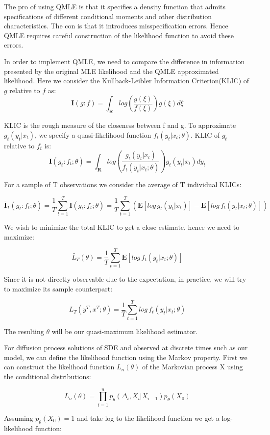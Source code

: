 \begin{spacing}{1.5}
The pro of using QMLE is that it specifies a density function that admits specifications of different conditional moments and other distribution characteristics. The con is that it introduces misspecification errors. Hence QMLE requires careful construction of the likelihood function to avoid these errors.

In order to implement QMLE, we need to compare the difference in information presented by the original MLE likelihood and the QMLE approximated likelihood. Here we consider the Kullback-Leibler Information Criterion(KLIC) of $g$ relative to $f$ as: 
$$
 \mathbf{I} (g:f) = \int_{\mathbf{R}} log(\frac{g(\xi)}{f(\xi)})g(\xi)d\xi
$$

KLIC is the rough measure of the closeness between f and g. To approximate $g_t(y_t|x_t)$, we specify a quasi-likelihood function $f_t(y_t|x_t;\theta)$. KLIC of $g_t$ relative to $f_t$ is:
$$
 \mathbf{I} (g_t:f_t;\theta) = \int_{\mathbf{R}} log(\frac{g_t(y_t|x_t)}{f_t(y_t|x_t;\theta)})g_t(y_t|x_t)dy_t
$$

For a sample of T observations we consider the average of T individual KLICs:

$$
 \bar{\mathbf{I}}_T (g_t:f_t;\theta) = \frac{1}{T} \sum_{t=1}^{T}\mathbf{I}(g_t:f_t;\theta)=\frac{1}{T} \sum_{t=1}^{T}(\mathbf{E}[log\,g_t(y_t|x_t)]-\mathbf{E}[log\, f_t(y_t|x_t;\theta)])
$$

We wish to minimize the total KLIC to get a close estimate, hence we need to maximize:

$$
\bar{L}_T(\theta)=\frac{1}{T}\sum_{t = 1}^{T}\mathbf{E}[log\, f_t(y_t|x_t;\theta)]
$$

Since it is not directly observable due to the expectation, in practice, we will try to maximize its sample counterpart:

$$
L_T(y^T,x^T;\theta)=\frac{1}{T}\sum_{t = 1}^{T}log\, f_t(y_t|x_t;\theta)
$$

The resulting $\theta$ will be our quasi-maximum likelihood estimator.

For diffusion process solutions of SDE and observed at discrete times such as our model, we can define the likelihood function using the Markov property. First we can construct the likelihood function $L_n(\theta)$ of the Markovian process X using the conditional distributions:

$$
L_n(\theta) = \prod_{i=1}^{n}p_{\theta}(\Delta_i,X_i|X_{i-1})p_{\theta}(X_0)
$$

Assuming $p_{\theta}(X_0)=1$ and take log to the likelihood function we get a log-likelihood function:


\end{spacing}
